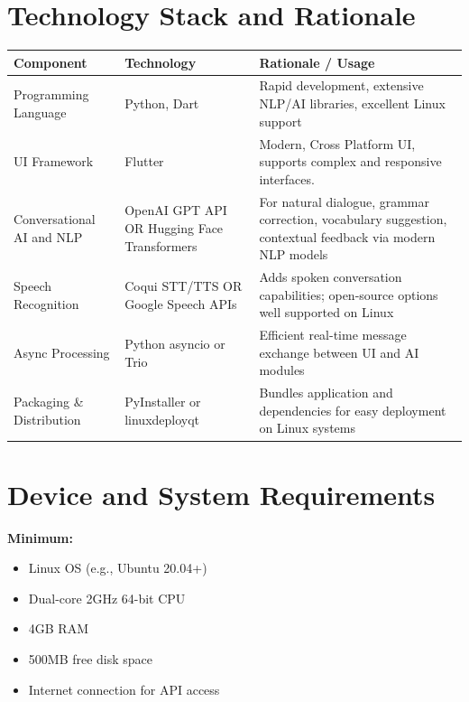 \documentclass[12pt]{article}
\begin{document}
\section*{Technology Stack and Rationale}

\begin{tabular}{|p{4cm}|p{6cm}|p{4cm}|}
\hline
\textbf{Component} & \textbf{Technology} & \textbf{Rationale / Usage} \\
\hline
Programming Language & Python, Dart & Rapid development, extensive NLP/AI libraries, excellent Linux support \\
\hline
UI Framework & Flutter & Modern, Cross Platform UI, supports complex and responsive interfaces.\\
\hline
Conversational AI and NLP & OpenAI GPT API \newline OR Hugging Face Transformers & For natural dialogue, grammar correction, vocabulary suggestion, contextual feedback via modern NLP models \\
\hline
Speech Recognition & Coqui STT/TTS \newline OR Google Speech APIs & Adds spoken conversation capabilities; open-source options well supported on Linux \\
\hline
Async Processing & Python asyncio \newline or Trio & Efficient real-time message exchange between UI and AI modules \\
\hline
Packaging \& Distribution & PyInstaller \newline or linuxdeployqt & Bundles application and dependencies for easy deployment on Linux systems \\
\hline
\end{tabular}

\section*{Device and System Requirements}

\noindent \textbf{Minimum:}
\begin{itemize}
    \item Linux OS (e.g., Ubuntu 20.04+)
    \item Dual-core 2GHz 64-bit CPU
    \item 4GB RAM
    \item 500MB free disk space
    \item Internet connection for API access
\end{itemize}
\end{document}
